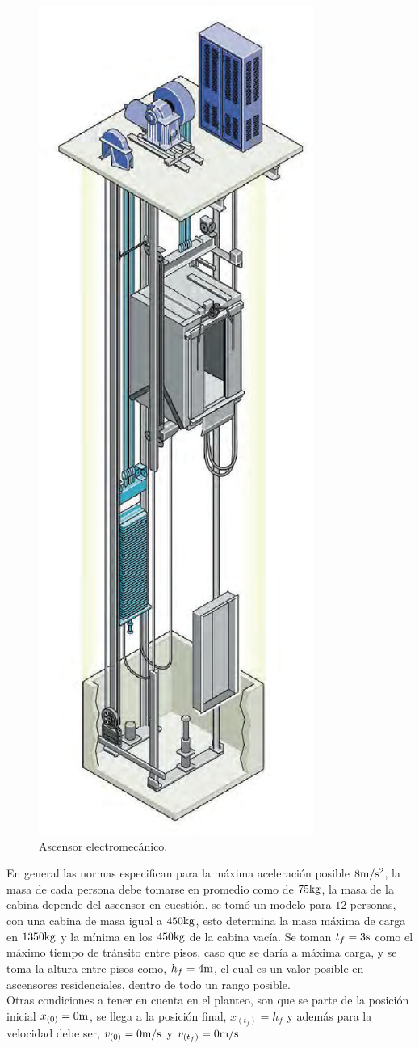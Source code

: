\begin{figure}
\begin{center}
\includegraphics[width=0.35 \linewidth, keepaspectratio=true]{img/diagrams/elevator.png} %
\caption{\label{fig:fig_elevator} \footnotesize{Ascensor electromecánico.}}
\end{center}
\end{figure}

En general las normas especifican para la máxima aceleración posible $8 \si[per-mode=symbol]{\meter\per\second\squared}$, la masa de cada persona debe tomarse en promedio como de $75 \si[per-mode=symbol]{\kilogram}$, la masa de la cabina depende del ascensor en cuestión, se tomó un modelo para $12$ personas, con una cabina de masa igual a $450 \si[per-mode=symbol]{\kilogram}$, esto determina la masa máxima de carga en $1350 \si[per-mode=symbol]{\kilogram}$ y la mínima en los $450 \si[per-mode=symbol]{\kilogram}$ de la cabina vacía. Se toman $t_{f} = 3 \si[per-mode=symbol]{\second}$ como el máximo tiempo de tránsito entre pisos, caso que se daría a máxima carga, y se toma la altura entre pisos como, $h_{f} = 4 \si[per-mode=symbol]{\meter}$, el cual es un valor posible en ascensores residenciales, dentro de todo un rango posible. \\
Otras condiciones a tener en cuenta en el planteo, son que se parte de la posición inicial $x_{\left(0\right)} = 0 \si[per-mode=symbol]{\meter}$, se llega a la posición final, $x_{\left( t_{f} \right)} = h_{f}$ y además para la velocidad debe ser, $v_{\left(0\right)} = 0 \si[per-mode=symbol]{\meter\per\second}$ y $v_{\left( t_{f} \right)} = 0 \si[per-mode=symbol]{\meter\per\second}$

